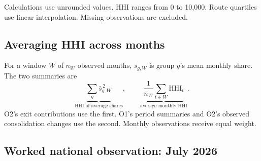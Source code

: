 Calculations use unrounded values. HHI ranges from 0 to 10,000. Route quartiles use linear interpolation. Missing observations are excluded.

\subsection{Averaging HHI across months}
\label{app:aggregation}
For a window $W$ of $n_W$ observed months, $\bar s_{g,W}$ is group $g$'s mean monthly share. The two summaries are
\begin{equation}
\underbrace{\sum_g \bar s_{g,W}^{\,2}}_{\text{HHI of average shares}},
\qquad
\underbrace{\frac{1}{n_W}\sum_{t\in W}\mathrm{HHI}_t}_{\text{average monthly HHI}}.
\tag{A.2}\label{eq:shared-aggregation}
\end{equation}
O2's exit contributions use the first. O1's period summaries and O2's observed consolidation changes use the second. Monthly observations receive equal weight.

\subsection{Worked national observation: July 2026}
\label{app:o4-national-calculations}

